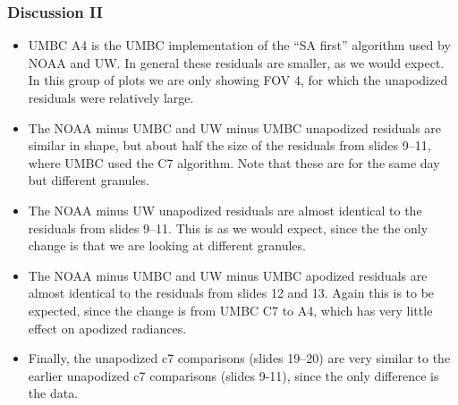 \documentclass[9pt]{beamer}
\begin{document}
\begin{frame}
\frametitle{Discussion II}
\begin{itemize}

  \item UMBC A4 is the UMBC implementation of the ``SA first''
    algorithm used by NOAA and UW.  In general these residuals are
    smaller, as we would expect.  In this group of plots we are only
    showing FOV 4, for which the unapodized residuals were
    relatively large.

  \item The NOAA minus UMBC and UW minus UMBC unapodized residuals
    are similar in shape, but about half the size of the residuals
    from slides 9--11, where UMBC used the C7 algorithm.  Note
    that these are for the same day but different granules.

  \item The NOAA minus UW unapodized residuals are almost identical
    to the residuals from slides 9--11.  This is as we would
    expect, since the the only change is that we are looking at
    different granules.

  \item The NOAA minus UMBC and UW minus UMBC apodized residuals are
    almost identical to the residuals from slides 12 and 13.  Again
    this is to be expected, since the change is from UMBC C7 to A4,
    which has very little effect on apodized radiances.

  \item Finally, the unapodized c7 comparisons (slides 19--20) are
    very similar to the earlier unapodized c7 comparisons (slides
    9-11), since the only difference is the data.


\end{itemize}
\end{frame}
\end{document}
